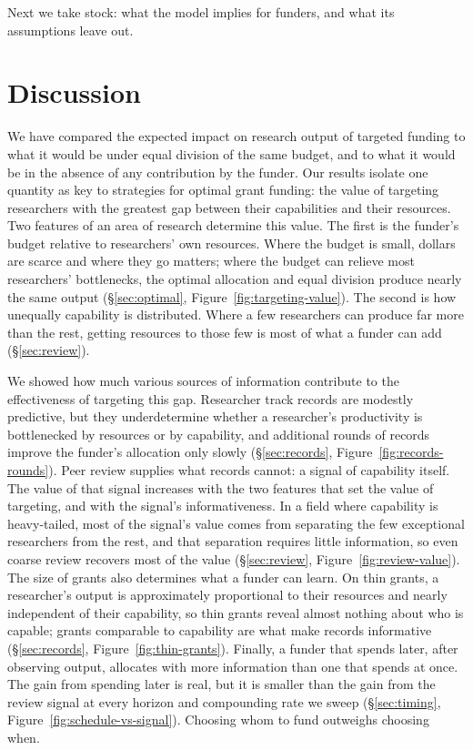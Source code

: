 \documentclass[article, 11pt, reqno]{amsart}
\theoremstyle{named}
\begin{document}


Next we take stock: what the model implies for funders, and what its assumptions leave
out.

\section{Discussion}\label{sec:discussion}

We have compared the expected impact on research output of targeted funding to what
it would be under equal division of the same budget, and to what it would be in the
absence of any contribution by the funder. Our results isolate one quantity as key to
strategies for optimal grant funding: the value of targeting researchers with the
greatest gap between their capabilities and their resources. Two features of an area
of research determine this value. The first is the funder's budget relative to
researchers' own resources. Where the budget is small, dollars are scarce and where
they go matters; where the budget can relieve most researchers' bottlenecks, the
optimal allocation and equal division produce nearly the same output
(\S\ref{sec:optimal}, Figure~\ref{fig:targeting-value}). The second is how unequally
capability is distributed. Where a few researchers can produce far more than the
rest, getting resources to those few is most of what a funder can add
(\S\ref{sec:review}).

We showed how much various sources of information contribute to the effectiveness of
targeting this gap. Researcher track records are modestly predictive, but they
underdetermine whether a researcher's productivity is bottlenecked by resources or by
capability, and additional rounds of records improve the funder's allocation only
slowly (\S\ref{sec:records}, Figure~\ref{fig:records-rounds}). Peer review supplies
what records cannot: a signal of capability itself. The value of that signal
increases with the two features that set the value of targeting, and with the
signal's informativeness. In a field where capability is heavy-tailed, most of the
signal's value comes from separating the few exceptional researchers from the rest,
and that separation requires little information, so even coarse review recovers most
of the value (\S\ref{sec:review}, Figure~\ref{fig:review-value}). The size of grants
also determines what a funder can learn. On thin grants, a researcher's output is
approximately proportional to their resources and nearly independent of their
capability, so thin grants reveal almost nothing about who is capable; grants
comparable to capability are what make records informative (\S\ref{sec:records},
Figure~\ref{fig:thin-grants}). Finally, a funder that spends later, after observing
output, allocates with more information than one that spends at once. The gain from
spending later is real, but it is smaller than the gain from the review signal at
every horizon and compounding rate we sweep (\S\ref{sec:timing},
Figure~\ref{fig:schedule-vs-signal}). Choosing whom to fund outweighs choosing when.
\end{document}
